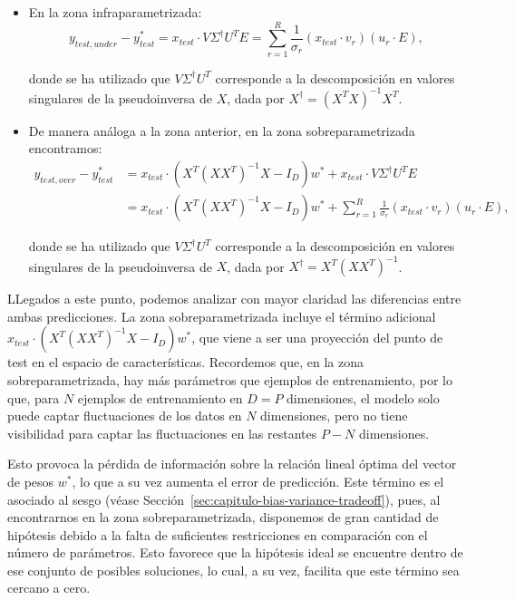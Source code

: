 \begin{itemize}
    \item En la zona infraparametrizada:
        \[
            y_{test, under} - y_{test}^{*} = x_{test} \cdot V \Sigma^{\dagger} U^{T} E = \sum_{r=1}^{R}\frac{1}{\sigma_r}(x_{test} \cdot v_r)(u_r \cdot E),
        \]

        donde se ha utilizado que $V \Sigma^{\dagger} U^{T}$ corresponde a la descomposición en valores singulares de la pseudoinversa de $X$, dada por $X^{\dagger} = {(X^T X)}^{-1} X^T$.

    \item De manera análoga a la zona anterior, en la zona sobreparametrizada encontramos: 
        \[
            \begin{aligned}
                y_{test, over} - y_{test}^{*} &= x_{test} \cdot (X^{T}{(XX^{T})}^{-1}X - I_{D}) w^{*} 
                + x_{test} \cdot V \Sigma^{\dagger} U^{T} E \\
                &= x_{test} \cdot (X^{T}{(XX^{T})}^{-1}X - I_{D}) w^{*} 
                + \sum_{r=1}^{R}\frac{1}{\sigma_r}(x_{test} \cdot v_r)(u_r \cdot E),
            \end{aligned}
        \]

        donde se ha utilizado que $V \Sigma^{\dagger} U^{T}$ corresponde a la descomposición en valores singulares de la pseudoinversa de $X$, dada por $X^{\dagger} = X^{T}{(XX^{T})}^{-1}$.
\end{itemize}

LLegados a este punto, podemos analizar con mayor claridad las diferencias entre ambas predicciones. La zona sobreparametrizada incluye el término adicional $x_{test} \cdot (X^{T}{(XX^{T})}^{-1}X - I_{D}) w^{*}$, que viene a ser una proyección del punto de test en el espacio de características. Recordemos que, en la zona sobreparametrizada, hay más parámetros que ejemplos de entrenamiento, por lo que, para $N$ ejemplos de entrenamiento en $D = P$ dimensiones, el modelo solo puede captar fluctuaciones de los datos en $N$ dimensiones, pero no tiene visibilidad para captar las fluctuaciones en las restantes $P - N$ dimensiones.

Esto provoca la pérdida de información sobre la relación lineal óptima del vector de pesos $w^{*}$, lo que a su vez aumenta el error de predicción. Este término es el asociado al sesgo (véase Sección~\ref{sec:capitulo-bias-variance-tradeoff}), pues, al encontrarnos en la zona sobreparametrizada, disponemos de gran cantidad de hipótesis debido a la falta de suficientes restricciones en comparación con el número de parámetros. Esto favorece que la hipótesis ideal se encuentre dentro de ese conjunto de posibles soluciones, lo cual, a su vez, facilita que este término sea cercano a cero.

